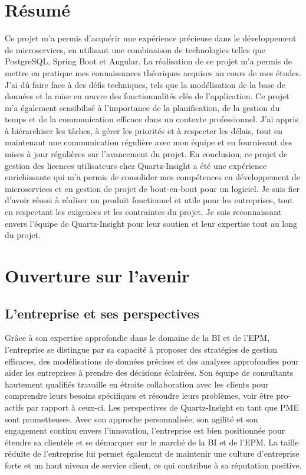 \documentclass[a4paper, 11pt]{report}
\begin{document}
\section{Résumé}
Ce projet m'a permis d'acquérir une expérience précieuse dans le dévelop\-pement de microservices, en utilisant une combinaison de technologies telles que PostgreSQL, Spring Boot et Angular.
La réalisation de ce projet m'a permis de mettre en pratique mes connaissances théoriques acquises au cours de mes études.
J'ai dû faire face à des défis techniques, tels que la modélisation de la base de données et la mise en œuvre des fonctionnalités clés de l'application.
Ce projet m'a également sensibilisé à l'importance de la planification, de la gestion du temps et de la communication efficace dans un contexte professionnel.
J'ai appris à hiérarchiser les tâches, à gérer les priorités et à respecter les délais, tout en maintenant une communication régulière avec mon équipe et en fournissant des mises à jour régulières sur l'avancement du projet.
\newline
\newline
En conclusion, ce projet de gestion des licences utilisateurs chez Quartz-Insight a été une expérience enrichissante qui m'a permis de consolider mes compétences en développement de microservices et en gestion de projet de bout-en-bout pour un logiciel.
Je suis fier d'avoir réussi à réaliser un produit fonctionnel et utile pour les entreprises, tout en respectant les exigences et les contraintes du projet.
Je suis reconnaissant envers l'équipe de Quartz-Insight pour leur soutien et leur expertise tout au long du projet.
\section{Ouverture sur l'avenir}

\subsection{L'entreprise et ses perspectives}
Grâce à son expertise approfondie dans le domaine de la BI et de l'EPM, l’entreprise se distingue par sa capacité à proposer des stratégies de gestion efficaces, des modélisations de données précises et des analyses approfondies pour aider les entreprises à prendre des décisions éclairées.
Son équipe de consultants hautement qualifiés travaille en étroite collaboration avec les clients pour comprendre leurs besoins spécifiques et résoudre leurs problèmes, voir être pro-actifs par rapport à ceux-ci.
\newline
\newline
Les perspectives de Quartz-Insight en tant que PME sont prometteuses.
Avec son approche personnalisée, son agilité et son engagement continu envers l'innovation, l'entreprise est bien positionnée pour étendre sa clientèle et se démarquer sur le marché de la BI et de l'EPM.
La taille réduite de l'entreprise lui permet également de maintenir une culture d'entreprise forte et un haut niveau de service client, ce qui contribue à sa réputation positive.
\end{document}
